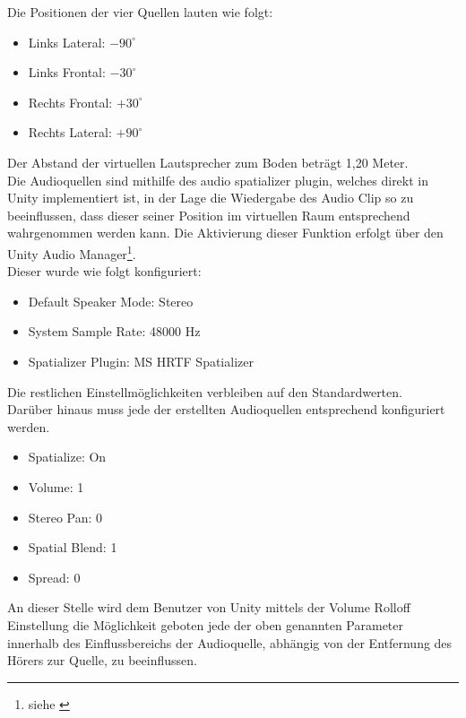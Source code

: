 Die Positionen der vier Quellen lauten wie folgt:
\begin{itemize}
\item Links Lateral: $-90^{\circ}$
\item Links Frontal: $-30^{\circ}$
\item Rechts Frontal: $+30^{\circ}$
\item Rechts Lateral: $+90^{\circ}$
\end{itemize}
Der Abstand der virtuellen Lautsprecher zum Boden beträgt 1,20 Meter. \\
Die Audioquellen sind mithilfe des audio spatializer plugin, welches direkt in Unity implementiert ist, in der Lage die Wiedergabe des Audio Clip so zu beeinflussen, dass dieser seiner Position im virtuellen Raum entsprechend wahrgenommen werden kann. Die Aktivierung dieser Funktion erfolgt über den Unity Audio Manager\footnote{siehe \cite{Spatial}}.\\
Dieser wurde wie folgt konfiguriert:
\begin{itemize}
\item Default Speaker Mode: Stereo
\item System Sample Rate: 48000 Hz
\item Spatializer Plugin: MS HRTF Spatializer
\end{itemize}
Die restlichen Einstellmöglichkeiten verbleiben auf den Standardwerten.\\
Darüber hinaus muss jede der erstellten Audioquellen entsprechend konfiguriert werden.
\begin{itemize}
\item Spatialize: On
\item Volume: 1
\item Stereo Pan: 0
\item Spatial Blend: 1
\item Spread: 0
\end{itemize}
An dieser Stelle wird dem Benutzer von Unity mittels der Volume Rolloff Einstellung die Möglichkeit geboten jede der oben genannten Parameter innerhalb des Einflussbereichs der Audioquelle, abhängig von der Entfernung des Hörers zur Quelle, zu beeinflussen.

\newpage

